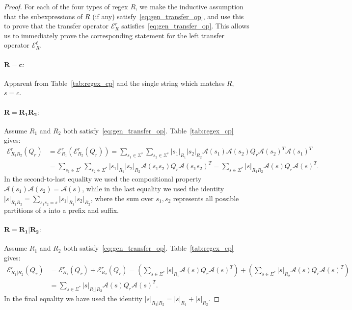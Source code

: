 \documentclass[twoside]{article}
\newcommand{\EL}{\mc{E}^{\scriptstyle \ell}}
\newcommand{\ER}{\mc{E}^{\scriptstyle r}}
\newcommand{\QR}{Q_{r}}
\newcommand{\sRone}{|s_1|_{R_1}}
\newcommand{\sRtwo}{|s_2|_{R_2}}
\newcommand{\mc}[1]{\mathcal{#1}}
\begin{document}
\begin{proof}

For each of the four types of regex $R$, we make the inductive assumption that the subexpressions of $R$ (if any) satisfy~\eqref{eq:gen_transfer_op}, and use this to prove that the transfer operator $\ER_R$ satisfies~\eqref{eq:gen_transfer_op}. This allows us to immediately prove the corresponding statement for the left transfer operator $\EL_R$.

\paragraph{$\mathbf{R = c:}$} Apparent from Table~\ref{tab:regex_cp} 
and the single string which matches $R$, $s = c$.
   
\paragraph{$\mathbf{R = R_1 R_2:}$} Assume $R_1$ and $R_2$ both satisfy~\eqref{eq:gen_transfer_op}. Table~\ref{tab:regex_cp} 
gives:
%
\begin{align*}
    \ER_{R_1 R_2}(\QR) &= \ER_{R_1}(\ER_{R_2}(\QR)) = \sum_{s_1 \in \Sigma^*} \sum_{s_2 \in \Sigma^*} \sRone \sRtwo \mc{A}(s_1) \mc{A}(s_2) \QR \mc{A}(s_2)^T \mc{A}(s_1)^T \\
    &= \sum_{s_1 \in \Sigma^*} \sum_{s_2 \in \Sigma^*} \sRone \sRtwo \mc{A}(s_1 s_2) \QR \mc{A}(s_1 s_2)^T = \sum_{s \in \Sigma^*} |s|_{R_1\! R_2} \mc{A}(s) \QR \mc{A}(s)^T.
\end{align*}
%
In the second-to-last equality we used the compositional property $\mc{A}(s_1)\mc{A}(s_2) = \mc{A}(s)$, while in the last equality we used the identity $|s|_{R_1 R_2} = \sum_{s_1 s_2 = s} |s_1|_{R_1} |s_2|_{R_2}$, where the sum over $s_1, s_2$ represents all possible partitions of $s$ into a prefix and suffix.

\paragraph{$\mathbf{R = R_1 | R_2:}$} Assume $R_1$ and $R_2$ both satisfy~\eqref{eq:gen_transfer_op}. Table~\ref{tab:regex_cp} 
gives:
%
\begin{align*}
    \ER_{R_1 | R_2}(\QR) &= \ER_{R_1}(\QR) + \ER_{R_2}(\QR) = \left(\sum_{s \in \Sigma^*} |s|_{R_1} \mc{A}(s) \QR \mc{A}(s)^T\right) + \left(\sum_{s \in \Sigma^*} |s|_{R_2} \mc{A}(s) \QR \mc{A}(s)^T\right) \\
    &= \sum_{s \in \Sigma^*} |s|_{R_1 | R_2} \mc{A}(s) \QR \mc{A}(s)^T.
\end{align*}
%
In the final equality we have used the identity $|s|_{R_1 | R_2} = |s|_{R_1} + |s|_{R_2}$.
   

\end{proof}
\end{document}

